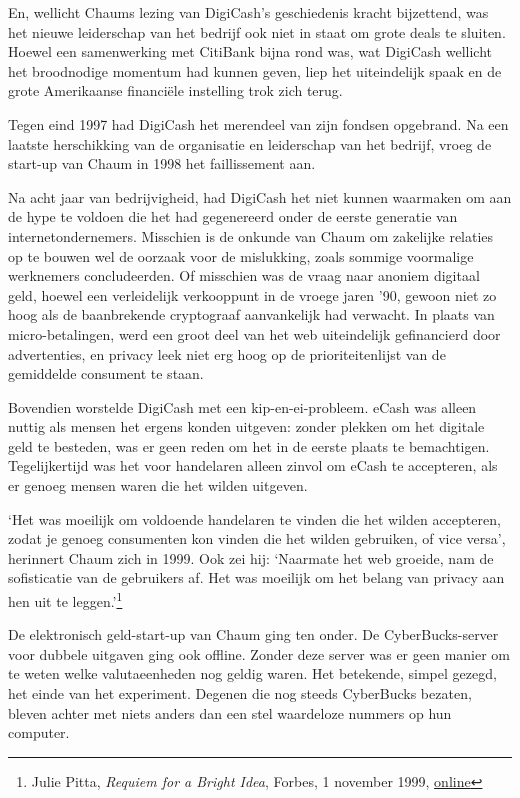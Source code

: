 \documentclass[
  a5paper,
  smalldemyvopaper,11pt,twoside,onecolumn,openright,extrafontsizes,
hidelinks]{memoir}
\begin{document}
En, wellicht Chaums lezing van DigiCash's geschiedenis kracht
bijzettend, was het nieuwe leiderschap van het bedrijf ook niet in staat
om grote deals te sluiten. Hoewel een samenwerking met CitiBank bijna
rond was, wat DigiCash wellicht het broodnodige momentum had kunnen
geven, liep het uiteindelijk spaak en de grote Amerikaanse financiële
instelling trok zich terug.

Tegen eind 1997 had DigiCash het merendeel van zijn fondsen opgebrand.
Na een laatste herschikking van de organisatie en leiderschap van het
bedrijf, vroeg de start-up van Chaum in 1998 het faillissement aan.

Na acht jaar van bedrijvigheid, had DigiCash het niet kunnen waarmaken
om aan de hype te voldoen die het had gegenereerd onder de eerste
generatie van internetondernemers. Misschien is de onkunde van Chaum om
zakelijke relaties op te bouwen wel de oorzaak voor de mislukking, zoals
sommige voormalige werknemers concludeerden. Of misschien was de vraag
naar anoniem digitaal geld, hoewel een verleidelijk verkooppunt in de
vroege jaren '90, gewoon niet zo hoog als de baanbrekende cryptograaf
aanvankelijk had verwacht. In plaats van micro-betalingen, werd een
groot deel van het web uiteindelijk gefinancierd door advertenties, en
privacy leek niet erg hoog op de prioriteitenlijst van de gemiddelde
consument te staan.

Bovendien worstelde DigiCash met een kip-en-ei-probleem. eCash was
alleen nuttig als mensen het ergens konden uitgeven: zonder plekken om
het digitale geld te besteden, was er geen reden om het in de eerste
plaats te bemachtigen. Tegelijkertijd was het voor handelaren alleen
zinvol om eCash te accepteren, als er genoeg mensen waren die het wilden
uitgeven.

`Het was moeilijk om voldoende handelaren te vinden die het wilden
accepteren, zodat je genoeg consumenten kon vinden die het wilden
gebruiken, of vice versa', herinnert Chaum zich in 1999. Ook zei hij:
`Naarmate het web groeide, nam de sofisticatie van de gebruikers af. Het
was moeilijk om het belang van privacy aan hen uit te
leggen.'\footnote{Julie Pitta, \emph{Requiem for a Bright Idea}, Forbes,
  1 november 1999,
  \href{https://www.forbes.com/forbes/1999/1101/6411390a.html}{online}}

De elektronisch geld-start-up van Chaum ging ten onder. De
CyberBucks-server voor dubbele uitgaven ging ook offline. Zonder deze
server was er geen manier om te weten welke valutaeenheden nog geldig
waren. Het betekende, simpel gezegd, het einde van het experiment.
Degenen die nog steeds CyberBucks bezaten, bleven achter met niets
anders dan een stel waardeloze nummers op hun computer.
\end{document}
